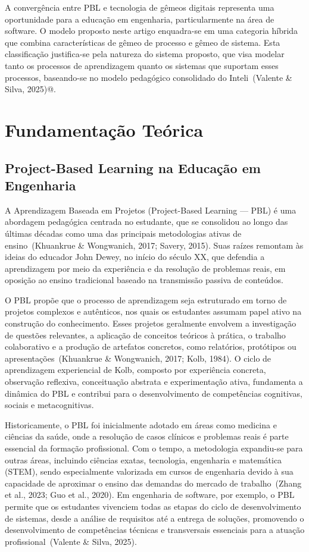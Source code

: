 \documentclass[english, spanish, brazilian]{modelo_dt}
\begin{document}
A convergência entre PBL e tecnologia de gêmeos digitais representa uma
oportunidade para a educação em engenharia, particularmente na área de
software\@. O modelo proposto neste artigo enquadra-se em uma categoria híbrida
que combina características de gêmeo de processo e gêmeo de sistema\@. Esta
classificação justifica-se pela natureza do sistema proposto, que visa modelar
tanto os processos de aprendizagem quanto os sistemas que suportam esses
processos, baseando-se no modelo pedagógico consolidado do Inteli~(Valente \&
Silva, 2025)@.

\section{Fundamentação Teórica}

\subsection{Project-Based Learning na Educação em Engenharia}

A Aprendizagem Baseada em Projetos (Project-Based Learning — PBL) é uma
abordagem pedagógica centrada no estudante, que se consolidou ao longo das
últimas décadas como uma das principais metodologias ativas de
ensino~(Khuankrue \& Wongwanich, 2017; Savery, 2015). Suas raízes remontam às
ideias do educador John Dewey, no início do século XX, que defendia a
aprendizagem por meio da experiência e da resolução de problemas reais, em
oposição ao ensino tradicional baseado na transmissão passiva de conteúdos.

O PBL propõe que o processo de aprendizagem seja estruturado em torno de
projetos complexos e autênticos, nos quais os estudantes assumam papel ativo na
construção do conhecimento. Esses projetos geralmente envolvem a investigação
de questões relevantes, a aplicação de conceitos teóricos à prática, o trabalho
colaborativo e a produção de artefatos concretos, como relatórios, protótipos
ou apresentações~(Khuankrue \& Wongwanich, 2017; Kolb, 1984). O ciclo de
aprendizagem experiencial de Kolb, composto por experiência concreta,
observação reflexiva, conceituação abstrata e experimentação ativa, fundamenta
a dinâmica do PBL e contribui para o desenvolvimento de competências
cognitivas, sociais e metacognitivas.

Historicamente, o PBL foi inicialmente adotado em áreas como medicina e
ciências da saúde, onde a resolução de casos clínicos e problemas reais é parte
essencial da formação profissional. Com o tempo, a metodologia expandiu-se para
outras áreas, incluindo ciências exatas, tecnologia, engenharia e matemática
(STEM), sendo especialmente valorizada em cursos de engenharia devido à sua
capacidade de aproximar o ensino das demandas do mercado de trabalho~(Zhang et
al., 2023; Guo et al., 2020). Em engenharia de software, por exemplo, o PBL
permite que os estudantes vivenciem todas as etapas do ciclo de desenvolvimento
de sistemas, desde a análise de requisitos até a entrega de soluções,
promovendo o desenvolvimento de competências técnicas e transversais essenciais
para a atuação profissional~(Valente \& Silva, 2025).
\end{document}
